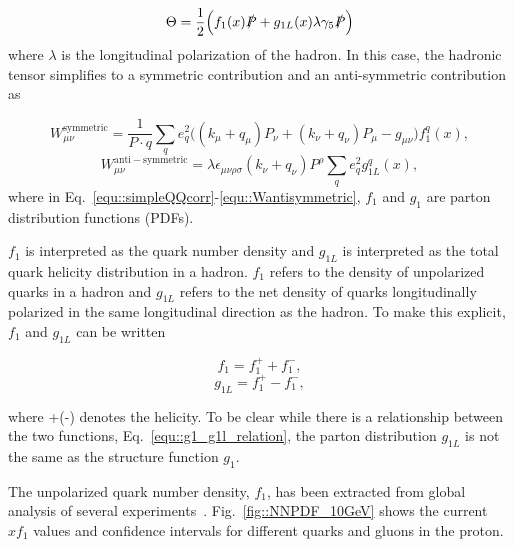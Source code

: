 \begin{equation}
  \label{equ::simpleQQcorr}
  \Theta = \frac{1}{2}
  \Big(
  f_1(x)\slashed{P} +
  g_{1L}(x)\lambda\gamma_5\slashed{P}
  \Big)
\end{equation}
\noindent
where $\lambda$ is the longitudinal polarization of the hadron.  In this case,
the hadronic tensor simplifies to a symmetric contribution and an anti-symmetric
contribution as~\cite{Barone:2001sp}

\begin{equation}
  \label{equ::simpleHadronTensor}
  W^{\mathrm{symmetric}}_{\mu\nu} = \frac{1}{P\cdot q} \sum_q e_q^2
  \Big( (k_{\mu}+q_{\mu})P_{\nu} + (k_{\nu}+q_{\nu})P_{\mu}-g_{\mu\nu}
  \Big) f_1^q(x),
\end{equation}
\begin{equation}
  W^{\mathrm{anti-symmetric}}_{\mu\nu} =
  \lambda\epsilon_{\mu\nu\rho\sigma}(k_{\nu}+q_{\nu})P^{\rho}\sum_q e^2_q
  g^q_{1L}(x),
  \label{equ::Wantisymmetric}
\end{equation}
\noindent
where in Eq.~\ref{equ::simpleQQcorr}-\ref{equ::Wantisymmetric}, $f_1$ and $g_1$
are parton distribution functions (PDFs).

$f_1$ is interpreted as the quark number density and $g_{1L}$ is interpreted as
the total quark helicity distribution in a hadron.  $f_1$ refers to the density
of unpolarized quarks in a hadron and $g_{1L}$ refers to the net density of
quarks longitudinally polarized in the same longitudinal direction as the
hadron.  To make this explicit, $f_1$ and $g_{1L}$ can be written

\begin{multicols}{2}
  \noindent
  \begin{equation}
    f_1 = f_1^{+} + f_1^{-},
  \end{equation}
  \begin{equation}
    g_{1L} = f_1^{+} - f_1^{-},
  \end{equation}
\end{multicols}
\noindent
where +(-) denotes the helicity.  To be clear while there is a relationship
between the two functions, Eq.~\ref{equ::g1_g1l_relation}, the parton
distribution $g_{1L}$ is not the same as the structure function $g_1$.

The unpolarized quark number density, $f_1$, has been extracted from global
analysis of several experiments~\cite{Rojo_2015}.  Fig.~\ref{fig::NNPDF_10GeV}
shows the current $xf_1$ values and confidence intervals for different quarks
and gluons in the proton.

